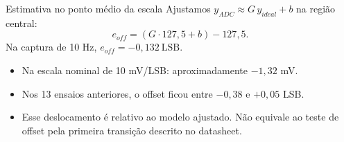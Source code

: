\begin{block}{Estimativa no ponto médio da escala}
Ajustamos $y_{ADC}\approx G\,y_{ideal}+b$ na região central:
\[
e_{off}=(G\cdot127{,}5+b)-127{,}5.
\]
Na captura de 10 Hz, $e_{off}=\boxed{-0{,}132\ \text{LSB}}$.
\end{block}
\begin{itemize}
\item Na escala nominal de 10 mV/LSB: aproximadamente $-1{,}32$ mV.
\item Nos 13 ensaios anteriores, o offset ficou entre $-0{,}38$ e $+0{,}05$ LSB.
\item Esse deslocamento é relativo ao modelo ajustado. Não equivale ao teste de offset pela primeira transição descrito no datasheet.
\end{itemize}

